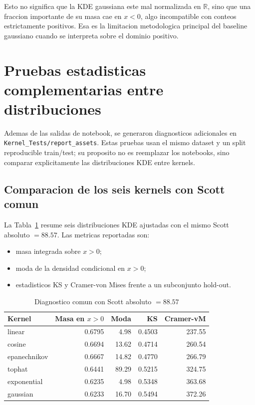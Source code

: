 \documentclass[11pt,a4paper]{article}
\begin{document}
Esto no significa que la KDE gaussiana este mal normalizada en \(\mathbb{R}\), sino que una fraccion
importante de su masa cae en \(x<0\), algo incompatible con conteos estrictamente positivos. Esa es
la limitacion metodologica principal del baseline gaussiano cuando se interpreta sobre el dominio
positivo.

\section{Pruebas estadisticas complementarias entre distribuciones}
Ademas de las salidas de notebook, se generaron diagnosticos adicionales en
\texttt{Kernel\_Tests/report\_assets}. Estas pruebas usan el mismo dataset y un split reproducible
train/test; su proposito no es reemplazar los notebooks, sino comparar explicitamente las
distribuciones KDE entre kernels.

\subsection{Comparacion de los seis kernels con Scott comun}
La Tabla~\ref{tab:common-scott} resume seis distribuciones KDE ajustadas con el mismo Scott absoluto
\(=88.57\). Las metricas reportadas son:
\begin{itemize}[leftmargin=1.5em]
\item masa integrada sobre \(x>0\);
\item moda de la densidad condicional en \(x>0\);
\item estadisticos KS y Cramer-von Mises frente a un subconjunto hold-out.
\end{itemize}

\begin{table}[H]
\centering
\caption{Diagnostico comun con Scott absoluto \(=88.57\)}
\label{tab:common-scott}
\begin{tabular}{lrrrr}
\toprule
Kernel & Masa en \(x>0\) & Moda & KS & Cramer-vM \\
\midrule
linear       & 0.6795 & 4.98  & 0.4503 & 237.55 \\
cosine       & 0.6694 & 13.62 & 0.4714 & 260.54 \\
epanechnikov & 0.6667 & 14.82 & 0.4770 & 266.79 \\
tophat       & 0.6441 & 89.29 & 0.5215 & 324.75 \\
exponential  & 0.6235 & 4.98  & 0.5348 & 363.68 \\
gaussian     & 0.6233 & 16.70 & 0.5494 & 372.26 \\
\bottomrule
\end{tabular}
\end{table}
\end{document}
